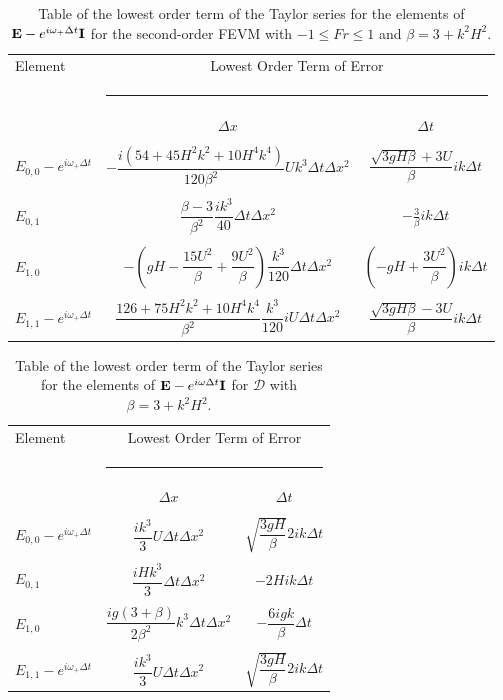 \begin{table}
	\begin{tabular}{l  c c}
	\hline
		Element & \multicolumn{2}{c}{Lowest Order Term of Error}\\
		&  \multicolumn{2}{l}{\rule{0.7\textwidth}{0.4pt}} \\
		& $\Delta x$&$\Delta t$\\
		\hline && \\
		$E_{0,0} -  e^{i \omega_+ \Delta t} $& $ -\dfrac{i \left(54 + 45H^2k^2 + 10H^4k^4\right)}{120\beta^2} U k^3 \Delta t \Delta x^2$ & $\dfrac{\sqrt{3gH \beta} + 3U}{\beta} ik \Delta t$ \\ & & \\
		$E_{0,1}$& $ \dfrac{\beta - 3}{\beta^2} \dfrac{ik^3}{40} \Delta  t\Delta x^2$ &  $ - \frac{3}{\beta} ik\Delta t$ \\ & & \\
		$E_{1,0}$& $ -\left(gH - \dfrac{15U^2}{\beta} + \dfrac{9U^2}{\beta}\right)  \dfrac{k^3}{120}\Delta t\Delta x^2$ &  $ \left(-gH + \dfrac{3U^2}{\beta}\right)ik \Delta t$ \\ & & \\
		$E_{1,1} -  e^{i \omega_+ \Delta t}$& $ \dfrac{126 + 75H^2 k^2 + 10 H^4 k^4}{\beta^2} \dfrac{k^3}{120} i U \Delta t\Delta x^2$ & $\dfrac{\sqrt{3gH \beta} - 3U}{\beta} ik \Delta t$ \\  \hline
	\end{tabular}
	\caption{Table of the lowest order term of the Taylor series for the elements of $\mathbf{E} - e^{i \omega_+ \Delta t} \mathbf{I}$ for the second-order FEVM with $ -1 \le Fr \le 1$ and $\beta = 3 + k^2 H^2$.}
	\label{tab:EerrFEVM2} 
\end{table}

\begin{table}
	\begin{tabular}{l  c c}
	\hline
		Element & \multicolumn{2}{c}{Lowest Order Term of Error}\\
		&  \multicolumn{2}{l}{\rule{0.7\textwidth}{0.4pt}} \\
		& $\Delta x$&$\Delta t$\\
		\hline && \\
		$E_{0,0} -  e^{i \omega_+ \Delta t} $&  $\dfrac{ik^3}{3} U \Delta t \Delta x^2$ & $ \sqrt{\dfrac{3gH}{\beta}} 2ik \Delta t $ \\ & & \\
		$E_{0,1}$& $\dfrac{iHk^3}{3} \Delta t \Delta x^2$ &  $-2Hi k \Delta t$ \\ & & \\
		$E_{1,0}$& $ \dfrac{ig \left(3 + \beta\right)}{2\beta^2} k^3\Delta t \Delta x^2$ &  $ -\dfrac{6igk}{\beta} \Delta t$ \\ & & \\
		$E_{1,1} -  e^{i \omega_+ \Delta t}$& $\dfrac{ik^3}{3} U \Delta t \Delta x^2$ & $ \sqrt{\dfrac{3gH}{\beta}} 2ik \Delta t $ \\  \hline
	\end{tabular}
	\caption{Table of the lowest order term of the Taylor series for the elements of $\mathbf{E} - e^{i \omega \Delta t} \mathbf{I}$ for $\mathcal{D}$ with $\beta = 3 + k^2 H^2$.}
	\label{tab:EerrD} 
\end{table}

